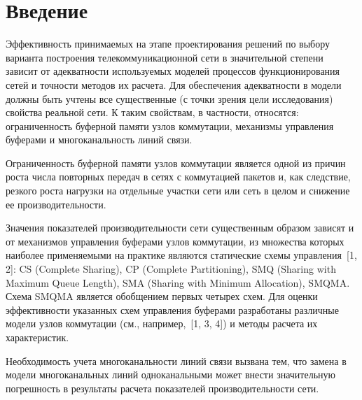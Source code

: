       \begin{multicols}{2}

            \label{st\stat}
     
\section{Введение}
     
     Эффективность принимаемых на этапе проектирования решений по 
выбору варианта по\-стро\-ения телекоммуникационной сети в значительной 
степени зависит от адекватности ис\-поль\-зу\-емых моде\-лей процессов 
функционирования сетей и точ\-ности методов их расчета. Для обеспечения 
адекватности в модели должны быть учтены все существенные (с точки 
зрения цели исследования) свойства реальной сети. К таким свойствам, в 
частности, относятся: ограниченность буферной памяти узлов коммутации, 
механизмы управления буферами и многоканальность линий связи. 
     
     Ограниченность буферной памяти узлов коммутации является одной из 
причин роста числа повторных передач в сетях с коммутацией пакетов и, как 
следствие, резкого роста нагрузки на отдельные участки сети или сеть в 
целом и снижение ее производительности. 
     
     Значения показателей производительности сети существенным образом 
зависят и от механизмов управления буферами узлов коммутации, из 
множества которых наиболее применяемыми на практике являются 
статические схемы управления~[1, 2]: CS (Complete Sharing), CP (Complete 
Partitioning), SMQ (Sharing with Maximum Queue Length), SMA (Sharing with 
Minimum Allocation), SMQMA. Схема SMQMA является обобщением первых четырех 
схем. Для оценки эффективности указанных схем управления буферами 
разработаны различные модели узлов коммутации (см., например,~[1, 3, 4]) и 
методы расчета их характеристик. 
     
     Необходимость учета многоканальности линий связи вызвана тем, что 
замена в модели многоканальных линий одноканальными может внести 
значительную погрешность в результаты расчета показателей 
производительности сети. 
     

\end{multicols}
